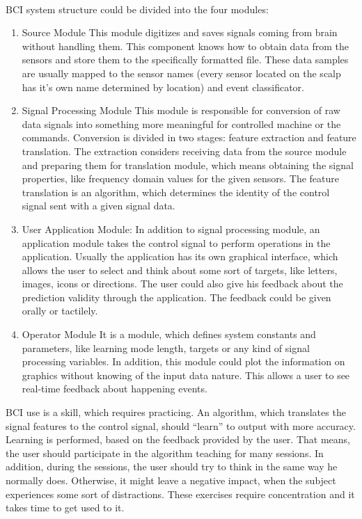 \documentclass[12pt]{article}
\begin{document}
\paragraph{}
BCI system structure could be divided into the four modules\cite{bci_shivangi}:
\begin{enumerate}
\item Source Module
This module digitizes and saves signals coming from brain without handling them. This component knows how to obtain data from the sensors and store them to the specifically formatted file. These data samples are usually mapped to the sensor names (every sensor located on the scalp has it's own name determined by location) and event classificator. 
\item Signal Processing Module
This module is responsible for conversion of raw data signals into something more meaningful for controlled machine or the commands. Conversion is divided in two stages: feature extraction and feature translation. The extraction considers receiving data from the source module and preparing them for translation module, which means obtaining the signal properties, like frequency domain values for the given sensors. The feature translation is an algorithm, which determines the identity of the control signal sent with a given signal data. 
\item User Application Module:
In addition to signal processing module, an application module takes the control signal to perform operations in the application. Usually the application has its own graphical interface, which allows the user to select and think about some sort of targets, like letters, images, icons or directions. The user could also give his feedback about the prediction validity through the application. The feedback could be given orally or tactilely. 
\item Operator Module
It is a module, which defines system constants and parameters, like learning mode length, targets or any kind of signal processing variables. In addition, this module could plot the information on graphics without knowing of the input data nature. This allows a user to see real-time feedback about happening events.
\end{enumerate}

BCI use is a skill, which requires practicing. An algorithm, which translates the signal features to the control signal, should ``learn'' to output with more accuracy. Learning is performed, based on the feedback provided by the user. That means, the user should participate in the algorithm teaching for many sessions. In addition, during the sessions, the user should try to think in the same way he normally does. Otherwise, it might leave a negative impact, when the subject experiences some sort of distractions. These exercises require concentration and it takes time to get used to it.
\end{document}
